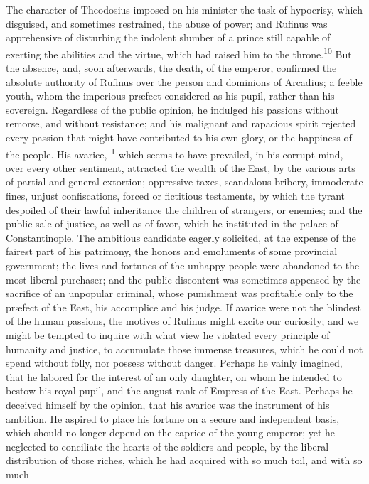 The character of Theodosius imposed on his minister the task of
hypocrisy, which disguised, and sometimes restrained, the abuse
of power; and Rufinus was apprehensive of disturbing the indolent
slumber of a prince still capable of exerting the abilities and
the virtue, which had raised him to the throne.\textsuperscript{10} But the
absence, and, soon afterwards, the death, of the emperor,
confirmed the absolute authority of Rufinus over the person and
dominions of Arcadius; a feeble youth, whom the imperious
præfect considered as his pupil, rather than his sovereign.
Regardless of the public opinion, he indulged his passions
without remorse, and without resistance; and his malignant and
rapacious spirit rejected every passion that might have
contributed to his own glory, or the happiness of the people. His
avarice,\textsuperscript{11} which seems to have prevailed, in his corrupt mind,
over every other sentiment, attracted the wealth of the East, by
the various arts of partial and general extortion; oppressive
taxes, scandalous bribery, immoderate fines, unjust
confiscations, forced or fictitious testaments, by which the
tyrant despoiled of their lawful inheritance the children of
strangers, or enemies; and the public sale of justice, as well as
of favor, which he instituted in the palace of Constantinople.
The ambitious candidate eagerly solicited, at the expense of the
fairest part of his patrimony, the honors and emoluments of some
provincial government; the lives and fortunes of the unhappy
people were abandoned to the most liberal purchaser; and the
public discontent was sometimes appeased by the sacrifice of an
unpopular criminal, whose punishment was profitable only to the
præfect of the East, his accomplice and his judge. If avarice
were not the blindest of the human passions, the motives of
Rufinus might excite our curiosity; and we might be tempted to
inquire with what view he violated every principle of humanity
and justice, to accumulate those immense treasures, which he
could not spend without folly, nor possess without danger.
Perhaps he vainly imagined, that he labored for the interest of
an only daughter, on whom he intended to bestow his royal pupil,
and the august rank of Empress of the East. Perhaps he deceived
himself by the opinion, that his avarice was the instrument of
his ambition. He aspired to place his fortune on a secure and
independent basis, which should no longer depend on the caprice
of the young emperor; yet he neglected to conciliate the hearts
of the soldiers and people, by the liberal distribution of those
riches, which he had acquired with so much toil, and with so much
